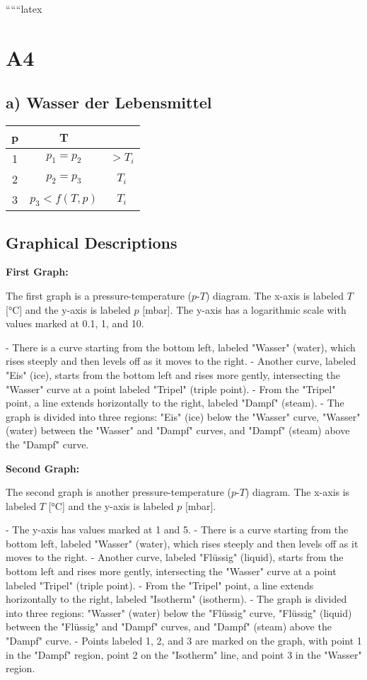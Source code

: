 
``````latex


\section*{A4}

\subsection*{a) Wasser der Lebensmittel}

\begin{tabular}{|c|c|c|}
\hline
p & T & \\
\hline
1 & $p_1 = p_2$ & $> T_i$ \\
2 & $p_2 = p_3$ & $T_i$ \\
3 & $p_3 < f(T,p)$ & $T_i$ \\
\hline
\end{tabular}

\subsection*{Graphical Descriptions}

\textbf{First Graph:}

The first graph is a pressure-temperature ($p$-$T$) diagram. The x-axis is labeled $T$ [°C] and the y-axis is labeled $p$ [mbar]. The y-axis has a logarithmic scale with values marked at 0.1, 1, and 10. 

- There is a curve starting from the bottom left, labeled "Wasser" (water), which rises steeply and then levels off as it moves to the right.
- Another curve, labeled "Eis" (ice), starts from the bottom left and rises more gently, intersecting the "Wasser" curve at a point labeled "Tripel" (triple point).
- From the "Tripel" point, a line extends horizontally to the right, labeled "Dampf" (steam).
- The graph is divided into three regions: "Eis" (ice) below the "Wasser" curve, "Wasser" (water) between the "Wasser" and "Dampf" curves, and "Dampf" (steam) above the "Dampf" curve.

\textbf{Second Graph:}

The second graph is another pressure-temperature ($p$-$T$) diagram. The x-axis is labeled $T$ [°C] and the y-axis is labeled $p$ [mbar]. 

- The y-axis has values marked at 1 and 5.
- There is a curve starting from the bottom left, labeled "Wasser" (water), which rises steeply and then levels off as it moves to the right.
- Another curve, labeled "Flüssig" (liquid), starts from the bottom left and rises more gently, intersecting the "Wasser" curve at a point labeled "Tripel" (triple point).
- From the "Tripel" point, a line extends horizontally to the right, labeled "Isotherm" (isotherm).
- The graph is divided into three regions: "Wasser" (water) below the "Flüssig" curve, "Flüssig" (liquid) between the "Flüssig" and "Dampf" curves, and "Dampf" (steam) above the "Dampf" curve.
- Points labeled 1, 2, and 3 are marked on the graph, with point 1 in the "Dampf" region, point 2 on the "Isotherm" line, and point 3 in the "Wasser" region.

